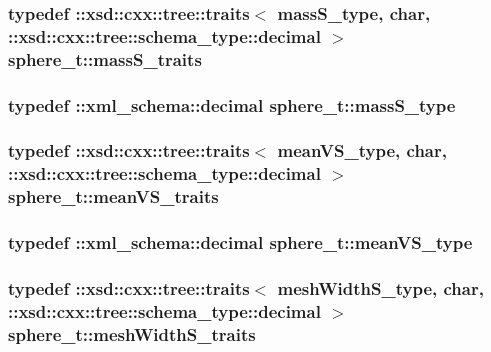 \hypertarget{classsphere__t_a7cab3fa5c1e9b5a04581b0262c9f5e5d}{
\subsubsection[{mass\-S\-\_\-traits}]{\setlength{\rightskip}{0pt plus 5cm}typedef \-::xsd\-::cxx\-::tree\-::traits$<$ {\bf mass\-S\-\_\-type}, char, \-::xsd\-::cxx\-::tree\-::schema\-\_\-type\-::decimal $>$ {\bf sphere\-\_\-t\-::mass\-S\-\_\-traits}}}\label{classsphere__t_a7cab3fa5c1e9b5a04581b0262c9f5e5d}
\hypertarget{classsphere__t_a317ddc20b1a4fa225c55721bf12c67b2}{
\subsubsection[{mass\-S\-\_\-type}]{\setlength{\rightskip}{0pt plus 5cm}typedef \-::{\bf xml\-\_\-schema\-::decimal} {\bf sphere\-\_\-t\-::mass\-S\-\_\-type}}}\label{classsphere__t_a317ddc20b1a4fa225c55721bf12c67b2}
\hypertarget{classsphere__t_a1ff4a5faedc4d9d2b8f4063516997840}{
\subsubsection[{mean\-V\-S\-\_\-traits}]{\setlength{\rightskip}{0pt plus 5cm}typedef \-::xsd\-::cxx\-::tree\-::traits$<$ {\bf mean\-V\-S\-\_\-type}, char, \-::xsd\-::cxx\-::tree\-::schema\-\_\-type\-::decimal $>$ {\bf sphere\-\_\-t\-::mean\-V\-S\-\_\-traits}}}\label{classsphere__t_a1ff4a5faedc4d9d2b8f4063516997840}
\hypertarget{classsphere__t_a351152e9b83bac409a627037b99a209b}{
\subsubsection[{mean\-V\-S\-\_\-type}]{\setlength{\rightskip}{0pt plus 5cm}typedef \-::{\bf xml\-\_\-schema\-::decimal} {\bf sphere\-\_\-t\-::mean\-V\-S\-\_\-type}}}\label{classsphere__t_a351152e9b83bac409a627037b99a209b}
\hypertarget{classsphere__t_a2efcf8f1a1ebfa301c88d3ffa429d1cd}{
\subsubsection[{mesh\-Width\-S\-\_\-traits}]{\setlength{\rightskip}{0pt plus 5cm}typedef \-::xsd\-::cxx\-::tree\-::traits$<$ {\bf mesh\-Width\-S\-\_\-type}, char, \-::xsd\-::cxx\-::tree\-::schema\-\_\-type\-::decimal $>$ {\bf sphere\-\_\-t\-::mesh\-Width\-S\-\_\-traits}}}\label{classsphere__t_a2efcf8f1a1ebfa301c88d3ffa429d1cd}
